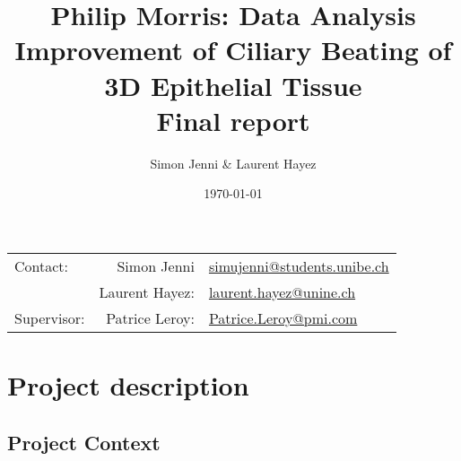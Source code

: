 \documentclass[11pt]{scrartcl}
\title{Philip Morris: Data Analysis Improvement of Ciliary Beating of 3D Epithelial Tissue\\\vspace{1cm}Final report\vspace{1cm}} %
\author{Simon Jenni \& Laurent Hayez} %
\date{\today} %
\begin{document}

\setfootsepline[text]{.4pt}

\pagestyle{scrheadings}
\ohead{}
\chead{}
\ofoot[\pagemark]{\pagemark}
\cfoot[]{}

\maketitle %

\thispagestyle{empty}

\begin{center}
\begin{tabular}{l r !{\textendash} l}
Contact: & Simon Jenni & \href{mailto:simujenni@students.unibe.ch}{simujenni@students.unibe.ch} \\ %
& Laurent Hayez: & \href{mailto:laurent.hayez@unine.ch}{laurent.hayez@unine.ch}\\
Supervisor: & Patrice Leroy: & \href{mailto:Patrice.Leroy@pmi.com)}{Patrice.Leroy@pmi.com} %
\end{tabular}
\end{center}


\vspace{1cm}
\renewcommand{\contentsname}{Table of contents}
\tableofcontents




\section{Project description}

\subsection{Project Context}
\end{document}

